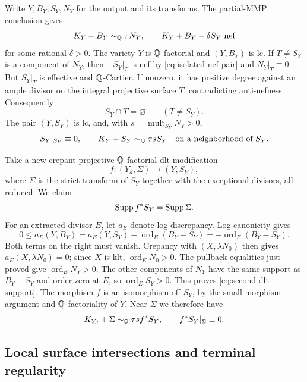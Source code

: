Write \(Y,B_Y,S_Y,N_Y\) for the output and its transforms.
The partial-MMP conclusion gives
\begin{equation}
\label{eq:isolated-nef-pair}
 K_Y+B_Y\sim_{\mathbb Q}\tau N_Y,\qquad
 K_Y+B_Y-\delta S_Y\ \text{nef}
\end{equation}
for some rational \(\delta>0\).
The variety \(Y\) is \(\mathbb Q\)-factorial and \((Y,B_Y)\) is lc.
If \(T\neq S_Y\) is a component of \(N_Y\), then
\(-S_Y|_T\) is nef by \eqref{eq:isolated-nef-pair} and \(N_Y|_T\equiv0\).
But \(S_Y|_T\) is effective and \(\mathbb Q\)-Cartier.  If nonzero, it has
positive degree against an ample divisor on the integral projective
surface \(T\), contradicting anti-nefness.  Consequently
\[
 S_Y\cap T=\varnothing\qquad(T\neq S_Y).
\]
The pair \((Y,S_Y)\) is lc, and, with \(s=\operatorname{mult}_{S_Y}N_Y>0\),
\begin{equation}
\label{eq:isolated-boundary}
 S_Y|_{S_Y}\equiv0,\qquad
 K_Y+S_Y\sim_{\mathbb Q}\tau s S_Y
 \quad\text{on a neighborhood of }S_Y .
\end{equation}

Take a new crepant projective \(\mathbb Q\)-factorial dlt modification
\[
 f:(Y_d,\Sigma)\longrightarrow(Y,S_Y),
\]
where \(\Sigma\) is the strict transform of \(S_Y\) together with the
exceptional divisors, all reduced.  We claim
\begin{equation}
\label{eq:second-dlt-support}
 \operatorname{Supp} f^*S_Y=\operatorname{Supp}\Sigma .
\end{equation}
For an extracted divisor \(E\), let \(a_E\) denote log discrepancy.
Log canonicity gives
\[
 0\leq a_E(Y,B_Y)
 =a_E(Y,S_Y)-\operatorname{ord}_E(B_Y-S_Y)
 =-\operatorname{ord}_E(B_Y-S_Y).
\]
Both terms on the right must vanish.
Crepancy with \((X,\lambda N_0)\) then gives
\(a_E(X,\lambda N_0)=0\); since \(X\) is klt,
\(\operatorname{ord}_E N_0>0\).
The pullback equalities just proved give
\(\operatorname{ord}_E N_Y>0\).
The other components of \(N_Y\) have the same support as \(B_Y-S_Y\)
and order zero at \(E\), so \(\operatorname{ord}_E S_Y>0\).
This proves \eqref{eq:second-dlt-support}.
The morphism \(f\) is an isomorphism off \(S_Y\), by the small-morphism
argument and \(\mathbb Q\)-factoriality of \(Y\).
Near \(\Sigma\) we therefore have
\begin{equation}
\label{eq:dlt-adjunction-input}
 K_{Y_d}+\Sigma\sim_{\mathbb Q}\tau s f^*S_Y,\qquad
 f^*S_Y|_\Sigma\equiv0 .
\end{equation}

\subsection{Local surface intersections and terminal regularity}

